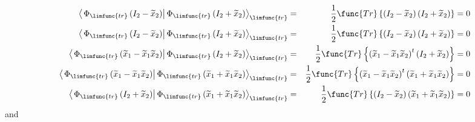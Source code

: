 \documentclass[aps,preprint]{revtex4}
\begin{document}
\begin{enumerate}
\begin{eqnarray}
\left\langle \left. \Phi _{\limfunc{tr}}\left( I_{2}-\widetilde{x}%
_{2}\right) \right\vert \Phi _{\limfunc{tr}}\left( I_{2}+\widetilde{x}%
_{2}\right) \right\rangle _{\limfunc{tr}} &=&\frac{1}{2}\func{Tr}\left\{
\left( I_{2}-\widetilde{x}_{2}\right) \left( I_{2}+\widetilde{x}_{2}\right)
\right\} =0 \\
\left\langle \left. \Phi _{\limfunc{tr}}\left( I_{2}-\widetilde{x}%
_{2}\right) \right\vert \Phi _{\limfunc{tr}}\left( I_{2}+\widetilde{x}%
_{2}\right) \right\rangle _{\limfunc{tr}} &=&\frac{1}{2}\func{Tr}\left\{
\left( I_{2}-\widetilde{x}_{2}\right) \left( I_{2}+\widetilde{x}_{2}\right)
\right\} =0 \\
\left\langle \left. \Phi _{\limfunc{tr}}\left( \widetilde{x}_{1}-\widetilde{x%
}_{1}\widetilde{x}_{2}\right) \right\vert \Phi _{\limfunc{tr}}\left( I_{2}+%
\widetilde{x}_{2}\right) \right\rangle _{\limfunc{tr}} &=&\frac{1}{2}\func{Tr%
}\left\{ \left( \widetilde{x}_{1}-\widetilde{x}_{1}\widetilde{x}_{2}\right)
^{t}\left( I_{2}+\widetilde{x}_{2}\right) \right\} =0 \\
\left\langle \left. \Phi _{\limfunc{tr}}\left( \widetilde{x}_{1}-\widetilde{x%
}_{1}\widetilde{x}_{2}\right) \right\vert \Phi _{\limfunc{tr}}\left( 
\widetilde{x}_{1}+\widetilde{x}_{1}\widetilde{x}_{2}\right) \right\rangle _{%
\limfunc{tr}} &=&\frac{1}{2}\func{Tr}\left\{ \left( \widetilde{x}_{1}-%
\widetilde{x}_{1}\widetilde{x}_{2}\right) ^{t}\left( \widetilde{x}_{1}+%
\widetilde{x}_{1}\widetilde{x}_{2}\right) \right\} =0 \\
\left\langle \left. \Phi _{\limfunc{tr}}\left( I_{2}+\widetilde{x}%
_{2}\right) \right\vert \Phi _{\limfunc{tr}}\left( \widetilde{x}_{1}+%
\widetilde{x}_{1}\widetilde{x}_{2}\right) \right\rangle _{\limfunc{tr}} &=&%
\frac{1}{2}\func{Tr}\left\{ \left( I_{2}-\widetilde{x}_{2}\right) \left( 
\widetilde{x}_{1}+\widetilde{x}_{1}\widetilde{x}_{2}\right) \right\} =0
\end{eqnarray}%
and


\end{enumerate}
\end{document}
